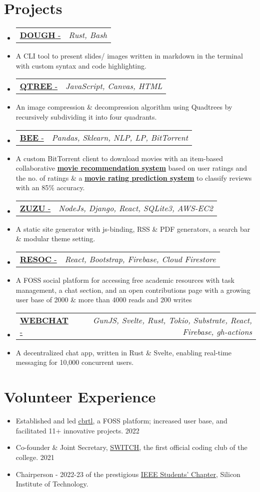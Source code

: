 \documentclass[letterpaper,10pt]{article}
\makeatletter
\newcommand{\resumeItem}[1]{
  \item\small{
    {#1 \vspace{-2pt}}
  }
}
\newcommand{\resumeProjectHeading}[2]{
    \item
    \begin{tabular*}{0.97\textwidth}{l@{\extracolsep{\fill}}r}
      \small#1 & \textit{\small #2} \\
    \end{tabular*}\vspace{-4 pt}
}
\newcommand{\resumeSubItem}[1]{\resumeItem{#1}\vspace{-4pt}}
\newcommand{\resumeSubHeadingListStart}{\begin{itemize}[leftmargin=0.15in, label={}]}
\newcommand{\resumeSubHeadingListEnd}{\end{itemize}}
\makeatother
\begin{document}
\section{Projects}
  \resumeSubHeadingListStart
  \resumeProjectHeading
    {\href{https://github.com/fuzzymfx/dough}{\textbf{DOUGH} - \faIcon{link}}}{Rust, Bash}
    \resumeSubItem
      {A CLI tool to present slides/ images written in markdown in the terminal with custom syntax and code highlighting.}
    \resumeProjectHeading
    {\href{https://anubhavp.dev/blog/qtree.html}{\textbf{QTREE} - \faIcon{link}}}{JavaScript, Canvas, HTML}
    \resumeSubItem
      {An image compression \& decompression algorithm using Quadtrees by recursively subdividing it into four quadrants. }
      \resumeProjectHeading
    {\href{https://github.com/fuzzymfx/b}{{\textbf{BEE} - \faIcon{link} }}}{Pandas, Sklearn, NLP, LP, BitTorrent}
    \resumeSubItem
      {A custom BitTorrent client to download movies with an item-based collaborative \href{https://github.com/fuzzymfx/Movie-recommendation}{\underline{\textbf{ movie recommendation system}}} based on user ratings and the no. of ratings \& a \href{https://github.com/fuzzymfx/Movie-rating-prediction}{\underline{\textbf{movie rating prediction system}}} to classify reviews with an 85\% accuracy.}
      \resumeProjectHeading
    {\href{https://github.com/fuzzymfx/zuzu}{\textbf{ZUZU} - \faIcon{link}}}{NodeJs, Django, React, SQLite3, AWS-EC2}
    \resumeSubItem
      {A static site generator with js-binding, RSS \& PDF generators, a search bar \& modular theme setting.}
      \resumeProjectHeading
    {\href{https://github.com/fuzzymfx/resoc}{\textbf{RESOC} - \faIcon{link} }}{React, Bootstrap, Firebase, Cloud Firestore}
    \resumeSubItem
      {A FOSS social platform for accessing free academic resources with task management, a chat section, and an open contributions page with a growing user base of 2000 \& more than 4000 reads and 200 writes}
    \resumeProjectHeading
    {\href{https://github.com/fuzzymfx/w3bchat-dapp}{\textbf{WEBCHAT} - \faIcon{link}}}{GunJS, Svelte, Rust, Tokio, Substrate, React, Firebase, gh-actions}
    \resumeSubItem
      {A decentralized chat app, written in Rust \& Svelte, enabling real-time messaging for 10,000 concurrent users. }
  \resumeSubHeadingListEnd

%

\section{Volunteer Experience}
  \resumeSubHeadingListStart
    \resumeSubItem
    {Established and led \href{https://cbrtl.github.io}{\underline{cbrtl}}, a FOSS platform; increased user base, and facilitated 11+ innovative projects. 2022}
    \resumeSubItem
      {Co-founder \& Joint Secretary, \href{https://www.linkedin.com/company/switch-sit/}{\underline{SWITCH}}, the first official coding club of the college. 2021}
    \resumeSubItem
      {Chairperson - 2022-23 of the prestigious \href{https://www.instagram.com/ieeesitbbsr/}{\underline{IEEE Students’ Chapter}}, Silicon Institute of Technology.}
  \resumeSubHeadingListEnd
\end{document}
